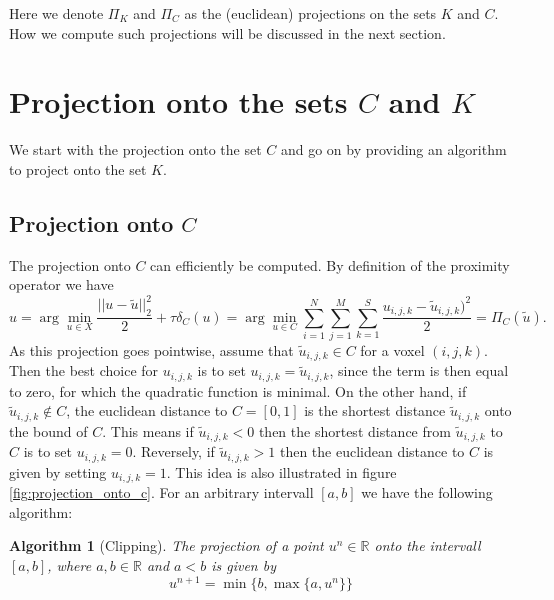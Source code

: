 \documentclass{scrreprt}
\newtheorem{algorithm}[theorem]{Algorithm}
\begin{document}
        Here we denote $\Pi_{K}$ and $\Pi_{C}$ as the (euclidean) projections on the sets $K$ and $C$. How we compute such projections will be discussed in the next section.

    \section{Projection onto the sets $C$ and $K$} %
    \label{sec:projection_onto_the_sets_C_and_K}

        We start with the projection onto the set $C$ and go on by providing an algorithm to project onto the set $K$.

        \subsection{Projection onto $C$}

        The projection onto $C$ can efficiently be computed. By definition of the proximity operator we have
            $$
                u = \arg\min_{u \in X} \frac{||u-\tilde{u}||_{2}^{2}}{2} + \tau \delta_{C}(u) = \arg\min_{u \in C} \sum_{i = 1}^{N} \sum_{j = 1}^{M} \sum_{k = 1}^{S} \frac{u_{i,j,k} - \tilde{u}_{i,j,k})^{2}}{2} = \Pi_{C}(\tilde{u}).
            $$
        As this projection goes pointwise, assume that $\tilde{u}_{i,j,k} \in C$ for a voxel $(i,j,k)$. Then the best choice for $u_{i,j,k}$ is to set $u_{i,j,k} = \tilde{u}_{i,j,k}$, since the term  is then equal to zero, for which the quadratic function is minimal. On the other hand, if $\tilde{u}_{i,j,k} \notin C$, the euclidean distance to $C = [0, 1]$ is the shortest distance $\tilde{u}_{i,j,k}$ onto the bound of $C$. This means if $\tilde{u}_{i,j,k} < 0$ then the shortest distance from $\tilde{u}_{i,j,k}$ to $C$ is to set $u_{i,j,k} = 0$. Reversely, if $\tilde{u}_{i,j,k} > 1$ then the euclidean distance to $C$ is given by setting $u_{i,j,k} = 1$. This idea is also illustrated in figure \ref{fig:projection_onto_c}. For an arbitrary intervall $[a, b]$ we have the following algorithm:

        \begin{algorithm}[Clipping]
            The projection of a point $u^{n} \in \mathbb{R}$ onto the intervall $[a, b]$, where $a,b \in \mathbb{R}$ and $a < b$ is given by
                \begin{equation}
                    u^{n+1} = \min\{b, \max \{ a, u^{n} \} \}
                    \label{eq:clipping}
                \end{equation}
        \end{algorithm}
\end{document}
